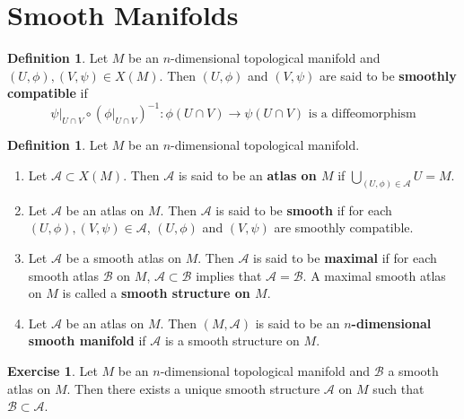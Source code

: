 \documentclass{book}
\theoremstyle{definition}
\newtheorem{defn}[definition]{Definition}
\newtheorem{ex}[definition]{Exercise}
\newcommand{\MA}{\mathcal{A}}
\newcommand{\MB}{\mathcal{B}}
\DeclareMathOperator*{\0}{\mbf{0}}
\DeclareMathOperator*{\1}{\mbf{1}}
\begin{document}
	
	
	
	
	
	
	
	
	
	
	
	
	\newpage
	\section{Smooth Manifolds}

	\begin{defn}
		Let $M$ be an $n$-dimensional topological manifold and $(U, \phi), (V, \psi) \in X(M)$. Then $(U, \phi)$ and $(V, \psi)$ are said to be \textbf{smoothly compatible} if $$\psi|_{U \cap V} \circ (\phi|_{U \cap V})^{-1}: \phi(U \cap V) \rightarrow \psi (U \cap V) \text{ is a diffeomorphism}$$ 
	\end{defn}

	\begin{defn} Let $M$ be an $n$-dimensional topological manifold.
		\begin{enumerate}
			\item Let $\MA \subset X(M)$. Then $\MA$ is said to be an \textbf{atlas on $M$} if  $\bigcup\limits_{(U,\phi) \in \MA} U = M$.
			\item Let $\MA$ be an atlas on $M$. Then $\MA$ is said to be \textbf{smooth} if for each $(U, \phi), (V, \psi) \in \MA$, $(U,\phi)$ and $(V,\psi)$ are smoothly compatible.
			\item Let $\MA$ be a smooth atlas on $M$. Then $\MA$ is said to be \textbf{maximal} if for each smooth atlas $\MB$ on $M$, $\MA \subset \MB$ implies that $\MA = \MB$. A maximal smooth atlas on $M$ is called a \textbf{smooth structure on $M$}.
			\item Let $\MA$ be an atlas on $M$. Then $(M, \MA)$ is said to be an \textbf{$n$-dimensional smooth manifold} if $\MA$ is a smooth structure on $M$. 
		\end{enumerate}
	\end{defn}

	\begin{ex}
		Let $M$ be an $n$-dimensional topological manifold and $\MB$ a smooth atlas on $M$. Then there exists a unique smooth structure $\MA$ on $M$ such that $\MB \subset \MA$.
	\end{ex}
\end{document}
